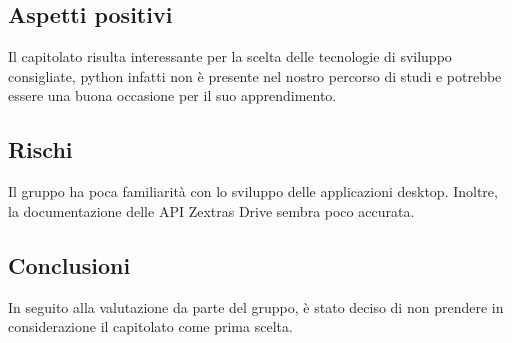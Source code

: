 \documentclass[../studio-di-fattibilita.tex]{subfiles}
\begin{document}
\subsection{Aspetti positivi}%
\label{sub:c7_aspetti_positivi}
Il capitolato risulta interessante per la scelta delle tecnologie di sviluppo consigliate, python infatti non è presente nel nostro percorso di studi e potrebbe essere una buona occasione per il suo apprendimento.

\subsection{Rischi}%
\label{sub:c7_rischi}
Il gruppo ha poca familiarità con lo sviluppo delle applicazioni desktop. Inoltre, la documentazione delle API Zextras Drive sembra poco accurata.
\subsection{Conclusioni}%
\label{sub:c7_conclusioni}
In seguito alla valutazione da parte del gruppo, è stato deciso di non prendere in considerazione il capitolato come prima scelta.
\end{document}
